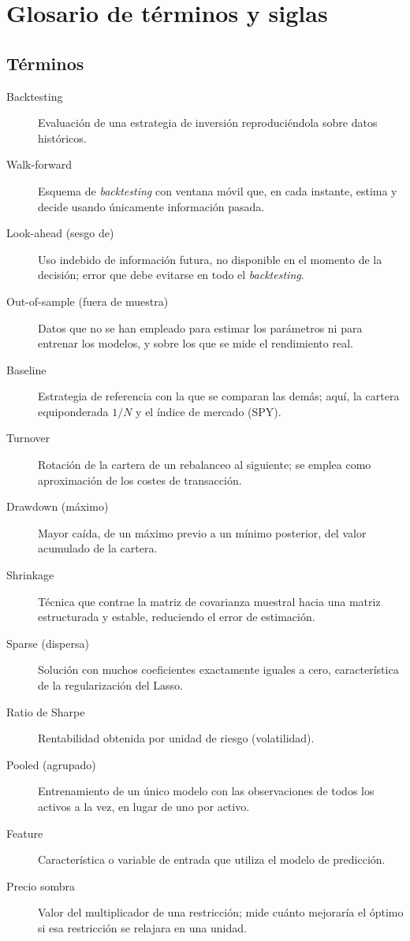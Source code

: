 \chapter*{Glosario de términos y siglas}

\section*{Términos}

\begin{description}
    \item[Backtesting] Evaluación de una estrategia de inversión reproduciéndola sobre datos históricos.
    \item[Walk-forward] Esquema de \textit{backtesting} con ventana móvil que, en cada instante, estima y decide usando únicamente información pasada.
    \item[Look-ahead (sesgo de)] Uso indebido de información futura, no disponible en el momento de la decisión; error que debe evitarse en todo el \textit{backtesting}.
    \item[Out-of-sample (fuera de muestra)] Datos que no se han empleado para estimar los parámetros ni para entrenar los modelos, y sobre los que se mide el rendimiento real.
    \item[Baseline] Estrategia de referencia con la que se comparan las demás; aquí, la cartera equiponderada $1/N$ y el índice de mercado (SPY).
    \item[Turnover] Rotación de la cartera de un rebalanceo al siguiente; se emplea como aproximación de los costes de transacción.
    \item[Drawdown (máximo)] Mayor caída, de un máximo previo a un mínimo posterior, del valor acumulado de la cartera.
    \item[Shrinkage] Técnica que contrae la matriz de covarianza muestral hacia una matriz estructurada y estable, reduciendo el error de estimación.
    \item[Sparse (dispersa)] Solución con muchos coeficientes exactamente iguales a cero, característica de la regularización del Lasso.
    \item[Ratio de Sharpe] Rentabilidad obtenida por unidad de riesgo (volatilidad).
    \item[Pooled (agrupado)] Entrenamiento de un único modelo con las observaciones de todos los activos a la vez, en lugar de uno por activo.
    \item[Feature] Característica o variable de entrada que utiliza el modelo de predicción.
    \item[Precio sombra] Valor del multiplicador de una restricción; mide cuánto mejoraría el óptimo si esa restricción se relajara en una unidad.
\end{description}

